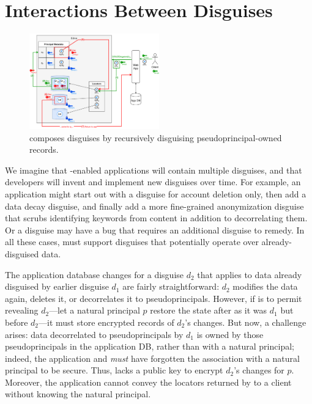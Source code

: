 \section{Interactions Between Disguises}
\label{s:composition}

\begin{figure}[t]
    \centering
    \includegraphics[width=0.5\textwidth]{figs/edna_reveal}
    \caption{\sys composes disguises by recursively disguising
             pseudoprincipal-owned records.}
    \label{f:recursive}
\end{figure}

%
We imagine that \sys-enabled applications will contain multiple
disguises, and that developers will invent and implement new disguises
over time.
%
For example, an application might start out with a disguise for account
deletion only, then add a data decay disguise, and finally add a more
fine-grained anonymization disguise that scrubs identifying keywords
from content in addition to decorrelating them.
%
Or a disguise may have a bug that requires an additional disguise
to remedy.
%
In all these cases, \sys must support disguises that potentially
operate over already-disguised data.
%

%
The application database changes for a disguise $d_2$ that applies
to data already disguised by earlier disguise $d_1$ are fairly
straightforward: $d_2$ modifies the data again, deletes it, or
decorrelates it to pseudoprincipals.
%
However, if \sys is to permit revealing $d_2$---\ie let a natural
principal $p$ restore the state after as it was $d_1$ but before
$d_2$---it must store encrypted records of $d_2$'s changes.
%
But now, a challenge arises: data decorrelated to pseudoprincipals
by $d_1$ is owned by those pseudoprincipals in the application
DB, rather than with a natural principal; indeed, the application
and \sys \emph{must} have forgotten the association with a natural
principal to be secure.
%
Thus, \sys lacks a public key to encrypt $d_2$'s changes for $p$.
%
Moreover, the application cannot convey the locators returned by
\sys to a client without knowing the natural principal.
%

